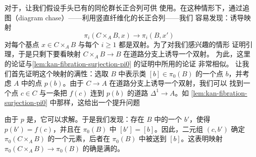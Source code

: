 \begin{remark}\label{rem:reedy-simplicial}
对于\trSimplicialSets{}，让我们假设手头已有\trKanFibration{}的同伦群长正合列可供
使用。在这种情形下，通过追图（diagram chase）——利用竖直纤维化的长正合列——我们
容易发现：诱导映射
\[
\pi_i(C \times_A B, x) \longrightarrow \pi_i(B, x')
\]
对每个基点 $x \in C \times_A B$ 与每个 $i \ge 1$ 都是双射。为了对我们感兴趣的情形
证明\trReedy{}引理，于是只剩下要看映射 $C \times_A B \to B$ 在道路分支上诱导一个双射。
为此，这里的论证与\cref{lem:kan-fibration-surjection-pi0} 的证明中所用的论证
非常相似。
让我们首先证明这个映射的满性：选取 $B$ 中表示类 $[b] \in \pi_0(B)$ 的一个点
$b$，并考虑 $A$ 中的点 $p(b)$。由于 $C \to A$ 在道路分支上诱导一个双射，我们可以
找到一个点 $c \in C$ 与一条把 $f(c)$ 连到 $p(b)$ 的道路 $\Delta^1 \to A$。如
\cref{lem:kan-fibration-surjection-pi0} 中那样，这给出一个提升问题
\begin{center}
\end{center}
由于 $p$ 是\trKanFibration{}，它可以求解。于是我们发现：存在 $B$ 中的一个
$b'$，使得 $p(b') = f(c)$，并且在 $\pi_0(B)$ 中 $[b'] = [b]$。因此，二元组
$(c, b')$ 确定 $\pi_0(C \times_A B)$ 的一个元素，后者在 $\pi_0(B)$ 中被送到
$[b]$。这表明映射 $\pi_0(C \times_A B) \to \pi_0(B)$ 的确是满的。


\end{remark}
